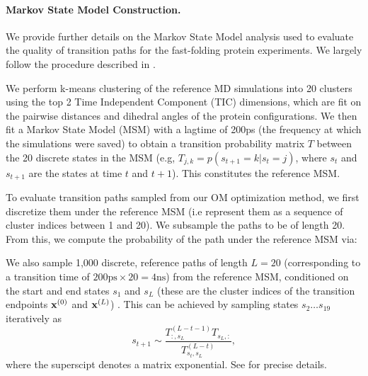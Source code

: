 \paragraph{Markov State Model Construction.}
We provide further details on the Markov State Model analysis used to evaluate the quality of transition paths for the fast-folding protein experiments. We largely follow the procedure described in \citet{jing2024generative}.

We perform k-means clustering of the reference MD simulations into 20 clusters using the top 2 Time Independent Component (TIC) dimensions, which are fit on the pairwise distances and dihedral angles of the protein configurations. We then fit a Markov State Model (MSM) with a lagtime of 200ps (the frequency at which the simulations were saved) to obtain a transition probability matrix $T$ between the 20 discrete states in the MSM (e.g, $T_{j,k} = p (s_{t+1} = k | s_t = j)$, where $s_t$ and $s_{t+1}$ are the states at time $t$ and $t+1$). This constitutes the reference MSM.

To evaluate transition paths sampled from our OM optimization method, we first discretize them under the reference MSM (i.e represent them as a sequence of cluster indices between 1 and 20). We subsample the paths to be of length 20. From this, we compute the probability of the path under the reference MSM via:

We also sample 1,000 discrete, reference paths of length $L=20$ (corresponding to a transition time of $200 \text{ps} \times 20 = 4 \text{ns}$) from the reference MSM, conditioned on the start and end states $s_1$ and $s_{L}$ (these are the cluster indices of the transition endpoints $\mathbf{x}^{(0)}$ and $\mathbf{x}^{(L)}$) . This can be achieved by sampling states $s_2 \ldots s_{19}$ iteratively as 
\begin{equation}
    s_{t+1} \sim \frac{T_{:, s_{L}}^{(L-t-1)} T_{s_{L}, :}}{T_{s_t, s_{L}}^{(L-t)}},
\end{equation}
where the superscipt denotes a matrix exponential. See \citet{jing2024generative} for precise details. 

